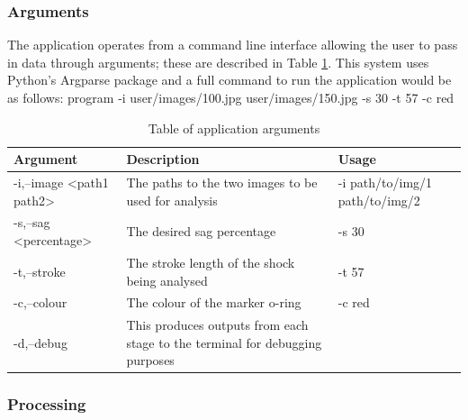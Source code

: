 	\subsubsection{Arguments}
		The application operates from a command line interface allowing the user to pass in data through arguments; these are described in Table \ref{tab:arguments}. This system uses Python's Argparse package and a full command to run the application would be as follows:
		{\centering \ttfamily program -i user/images/100.jpg user/images/150.jpg -s 30 -t 57 -c red}
		\begin{table}[h!]
			\centering
			\caption{Table of application arguments}
			\label{tab:arguments}
			\begin{tabular}{|l|p{}|p{}|}
			\hline
			\bfseries Argument&\bfseries Description&\bfseries Usage\\
			\hline
			{\ttfamily -i,--image <path1 path2>}&The paths to the two images to be used for analysis&{\ttfamily -i path/to/img/1 path/to/img/2}\\
			{\ttfamily -s,--sag <percentage>}&The desired sag percentage&{\ttfamily -s 30}\\
			{\ttfamily -t,--stroke}&The stroke length of the shock being analysed&{\ttfamily -t 57}\\
			{\ttfamily -c,--colour}&The colour of the marker o-ring&{\ttfamily -c red}\\
			{\ttfamily -d,--debug}&This produces outputs from each stage to the terminal for debugging purposes&\\
			\hline
			\end{tabular}
		\end{table}
	\subsubsection{Processing}
